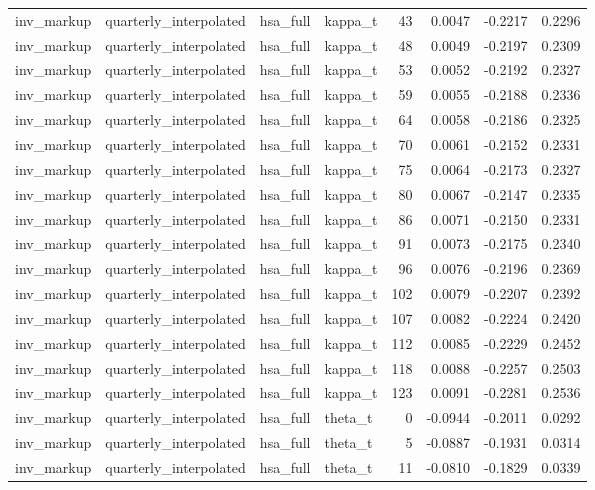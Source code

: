 \begin{tabular}{llllrrrr}
inv\_markup & quarterly\_interpolated & hsa\_full & kappa\_t & 43 & 0.0047 & -0.2217 & 0.2296 \\
inv\_markup & quarterly\_interpolated & hsa\_full & kappa\_t & 48 & 0.0049 & -0.2197 & 0.2309 \\
inv\_markup & quarterly\_interpolated & hsa\_full & kappa\_t & 53 & 0.0052 & -0.2192 & 0.2327 \\
inv\_markup & quarterly\_interpolated & hsa\_full & kappa\_t & 59 & 0.0055 & -0.2188 & 0.2336 \\
inv\_markup & quarterly\_interpolated & hsa\_full & kappa\_t & 64 & 0.0058 & -0.2186 & 0.2325 \\
inv\_markup & quarterly\_interpolated & hsa\_full & kappa\_t & 70 & 0.0061 & -0.2152 & 0.2331 \\
inv\_markup & quarterly\_interpolated & hsa\_full & kappa\_t & 75 & 0.0064 & -0.2173 & 0.2327 \\
inv\_markup & quarterly\_interpolated & hsa\_full & kappa\_t & 80 & 0.0067 & -0.2147 & 0.2335 \\
inv\_markup & quarterly\_interpolated & hsa\_full & kappa\_t & 86 & 0.0071 & -0.2150 & 0.2331 \\
inv\_markup & quarterly\_interpolated & hsa\_full & kappa\_t & 91 & 0.0073 & -0.2175 & 0.2340 \\
inv\_markup & quarterly\_interpolated & hsa\_full & kappa\_t & 96 & 0.0076 & -0.2196 & 0.2369 \\
inv\_markup & quarterly\_interpolated & hsa\_full & kappa\_t & 102 & 0.0079 & -0.2207 & 0.2392 \\
inv\_markup & quarterly\_interpolated & hsa\_full & kappa\_t & 107 & 0.0082 & -0.2224 & 0.2420 \\
inv\_markup & quarterly\_interpolated & hsa\_full & kappa\_t & 112 & 0.0085 & -0.2229 & 0.2452 \\
inv\_markup & quarterly\_interpolated & hsa\_full & kappa\_t & 118 & 0.0088 & -0.2257 & 0.2503 \\
inv\_markup & quarterly\_interpolated & hsa\_full & kappa\_t & 123 & 0.0091 & -0.2281 & 0.2536 \\
inv\_markup & quarterly\_interpolated & hsa\_full & theta\_t & 0 & -0.0944 & -0.2011 & 0.0292 \\
inv\_markup & quarterly\_interpolated & hsa\_full & theta\_t & 5 & -0.0887 & -0.1931 & 0.0314 \\
inv\_markup & quarterly\_interpolated & hsa\_full & theta\_t & 11 & -0.0810 & -0.1829 & 0.0339 \\

\end{tabular}
